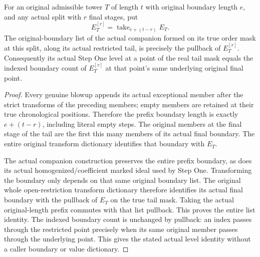 \begin{lemma}
\label{hir:original-companion-frozen-chronological-boundary-dictionary}
\leanok
{}
For an original admissible tower $T$ of length $t$ with original boundary
length $e$, and any actual split with $r$ final stages, put
\[
 E^{[r]}_T=\operatorname{take}_{e+(t-r)}E_T.
\]
The original-boundary list of the actual companion formed on its true order
mask at this split, along its actual restricted tail, is precisely the
pullback of $E^{[r]}_T$. Consequently its actual Step One level at a point of
the real tail mask equals the indexed boundary count of $E^{[r]}_T$ at that
point's same underlying original final point.
\end{lemma}
\begin{proof}
Every genuine blowup appends its actual exceptional member after the strict
transforms of the preceding members; empty members are retained at their true
chronological positions. Therefore the prefix boundary length is exactly
$e+(t-r)$, including literal empty steps. The original members at the final
stage of the tail are the first this many members of its actual final
boundary. The entire original transform dictionary identifies that boundary
with $E_T$.

The actual companion construction preserves the entire prefix boundary, as
does its actual homogenized/coefficient marked ideal used by Step One.
Transforming the boundary only depends on that same original boundary list.
The original whole open-restriction transform dictionary therefore identifies
its actual final boundary with the pullback of $E_T$ on the true tail mask.
Taking the actual original-length prefix commutes with that list pullback.
This proves the entire list identity. The indexed boundary count is unchanged
by pullback: an index passes through the restricted point precisely when its
same original member passes through the underlying point. This gives the
stated actual level identity without a caller boundary or value dictionary.
\end{proof}

